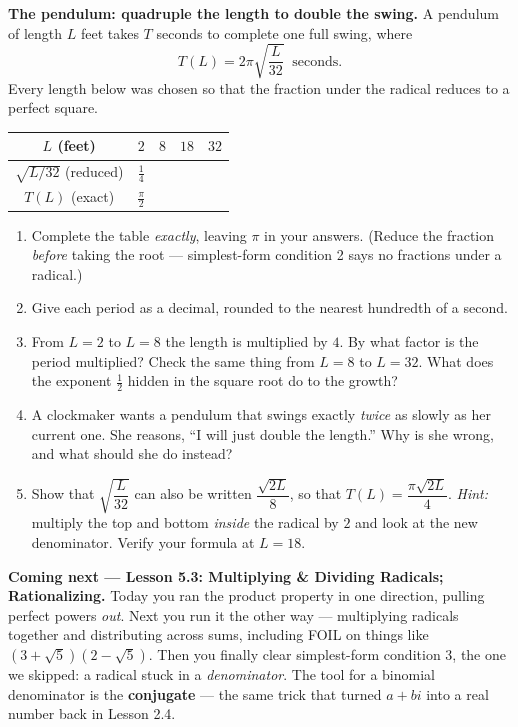 \documentclass[10pt]{article}
\begin{document}
\begin{extensionbox}
\textbf{The pendulum: quadruple the length to double the swing.} A pendulum of length $L$ feet takes
$T$ seconds to complete one full swing, where
\[
  T(L) = 2\pi\sqrt{\frac{L}{32}}\ \text{ seconds.}
\]
Every length below was chosen so that the fraction under the radical reduces to a perfect square.
\begin{center}
\renewcommand{\arraystretch}{1.3}
\begin{tabular}{|c|c|c|c|c|}
\hline
$L$ (feet)               & $2$ & $8$ & $18$ & $32$ \\ \hline
$\sqrt{L/32}$ (reduced)  & $\frac14$ & & & \\ \hline
$T(L)$ (exact)           & $\frac{\pi}{2}$ & & & \\ \hline
\end{tabular}
\end{center}
\begin{enumerate}[label=(\alph*), leftmargin=1.8em, itemsep=5pt]
  \item Complete the table \emph{exactly}, leaving $\pi$ in your answers. (Reduce the fraction
        \emph{before} taking the root --- simplest-form condition 2 says no fractions under a
        radical.)
  \item Give each period as a decimal, rounded to the nearest hundredth of a second.
  \item From $L=2$ to $L=8$ the length is multiplied by $4$. By what factor is the period
        multiplied? Check the same thing from $L=8$ to $L=32$. What does the exponent $\frac12$
        hidden in the square root do to the growth?
  \item A clockmaker wants a pendulum that swings exactly \emph{twice} as slowly as her current
        one. She reasons, ``I will just double the length.'' Why is she wrong, and what should she
        do instead?
  \item Show that $\sqrt{\dfrac{L}{32}}$ can also be written $\dfrac{\sqrt{2L}}{8}$, so that
        $T(L)=\dfrac{\pi\sqrt{2L}}{4}$. \emph{Hint:} multiply the top and bottom \emph{inside} the
        radical by $2$ and look at the new denominator. Verify your formula at $L=18$.
\end{enumerate}
\end{extensionbox}

\begin{spiralbox}
\textbf{Coming next --- Lesson 5.3: Multiplying \& Dividing Radicals; Rationalizing.} Today you ran
the product property in one direction, pulling perfect powers \emph{out}. Next you run it the other
way --- multiplying radicals together and distributing across sums, including FOIL on things like
$\left(3+\sqrt5\right)\left(2-\sqrt5\right)$. Then you finally clear simplest-form condition 3, the
one we skipped: a radical stuck in a \emph{denominator}. The tool for a binomial denominator is the
\textbf{conjugate} --- the same trick that turned $a+bi$ into a real number back in Lesson 2.4.
\end{spiralbox}
\end{document}

